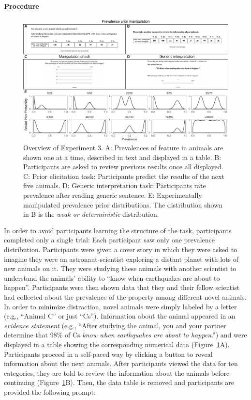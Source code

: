 \documentclass[floatsintext,man]{apa6}
\theoremstyle{definition}
\theoremstyle{definition}
\theoremstyle{definition}
\theoremstyle{remark}
\begin{document}
\paragraph{Procedure}\label{procedure}

\begin{figure}
\centering
\includegraphics{genint_files/figure-latex/priorManipulationExpt-1.pdf}
\caption{\label{fig:priorManipulationExpt}Overview of Experiment 3. A:
Prevalences of feature in animals are shown one at a time, described in
text and displayed in a table. B: Participants are asked to review
previous results once all displayed. C: Prior elicitation task:
Participants predict the results of the next five animals. D: Generic
interpretation task: Participants rate prevalence after reading generic
sentence. E: Experimentally manipulated prevalence prior distributions.
The distribution shown in B is the \emph{weak or deterministic}
distribution.}
\end{figure}

In order to avoid participants learning the structure of the task,
participants completed only a single trial: Each participant saw only
one prevalence distribution. Participants were given a cover story in
which they were asked to imagine they were an astronaut-scientist
exploring a distant planet with lots of new animals on it. They were
studying these animals with another scientist to understand the animals'
ability to \enquote{know when earthquakes are about to happen}.
Participants were then shown data that they and their fellow scientist
had collected about the prevalence of the property among different novel
animals. In order to minimize distraction, novel animals were simply
labeled by a letter (e.g., \enquote{Animal C} or just \enquote{Cs}).
Information about the animal appeared in an \emph{evidence statement}
(e.g., \enquote{After studying the animal, you and your partner
determine that 98\% of Cs \emph{know when earthquakes are about to
happen}.}) and were displayed in a table showing the corresponding
numerical data (Figure~\ref{fig:priorManipulationExpt}A). Participants
proceed in a self-paced way by clicking a button to reveal information
about the next animals. After participants viewed the data for ten
categories, they are told to review the information about the animals
before continuing (Figure~\ref{fig:priorManipulationExpt}B). Then, the
data table is removed and participants are provided the following
prompt:
\end{document}
